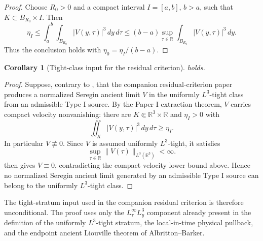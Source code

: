 \documentclass[11pt]{amsart}
\theoremstyle{plain}
\newtheorem{corollary}[theorem]{Corollary}
\theoremstyle{definition}
\theoremstyle{remark}
\numberwithin{equation}{section}
\newcommand{\R}{\mathbb R}
\begin{document}
\begin{proof}
Choose \(R_0>0\) and a compact interval \(I=[a,b]\), \(b>a\), such that
\(K\subset B_{R_0}\times I\).  Then
\[
   \eta_I
   \le \int_a^b\int_{B_{R_0}}|V(y,\tau)|^3\,dy\,d\tau
   \le (b-a)\sup_{\tau\in\R}
          \int_{B_{R_0}}|V(y,\tau)|^3\,dy .
\]
Thus the conclusion holds with \(\eta_0=\eta_I/(b-a)\).
\end{proof}

\begin{corollary}[Tight-class input for the residual criterion]
\label{cor:tight-input-for-paper-I}
 holds.
\end{corollary}

\begin{proof}
Suppose, contrary to , that the companion
residual-criterion paper produces a normalized Seregin ancient limit \(V\) in
the uniformly \(L^3\)-tight class from an admissible Type I source.  By the
Paper I extraction theorem, \(V\) carries compact velocity nonvanishing:
there are \(K\Subset\mathbb R^3\times\mathbb R\) and \(\eta_I>0\) with
\[
   \iint_K |V(y,\tau)|^3\,dy\,d\tau\ge\eta_I .
\]
In particular \(V\not\equiv0\).  Since \(V\) is assumed uniformly
\(L^3\)-tight, it satisfies
\[
   \sup_{\tau\in\R}\|V(\tau)\|_{L^3(\R^3)}<\infty .
\]
 then gives \(V\equiv0\), contradicting the compact
velocity lower bound above.  Hence no normalized Seregin ancient limit
generated by an admissible Type I source can belong to the uniformly
\(L^3\)-tight class.
\end{proof}

The tight-stratum input used in the companion residual criterion is therefore
unconditional.  The proof uses only the \(L^\infty_\tau L^3_y\) component
already present in the definition of the uniformly \(L^3\)-tight stratum, the
local-in-time physical pullback, and the endpoint ancient Liouville theorem
of Albritton--Barker.
\end{document}
